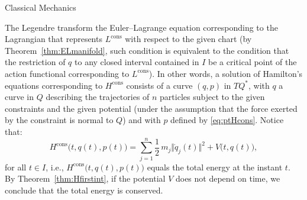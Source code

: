 \documentclass[oneside,a4paper,11pt]{amsbook}
\theoremstyle{remark}\newtheorem{exercise}{Exercise}[chapter]
\theoremstyle{plain}\newtheorem{teo}{Theorem}[section]
\theoremstyle{plain}\newtheorem{lem}[teo]{Lemma}
\theoremstyle{plain}\newtheorem{prop}[teo]{Proposition}
\theoremstyle{plain}\newtheorem{cor}[teo]{Corollary}
\theoremstyle{definition}\newtheorem{defin}[teo]{Definition}
\theoremstyle{remark}\newtheorem{rem}[teo]{Remark}
\theoremstyle{definition}\newtheorem{notation}[teo]{Notation}
\theoremstyle{definition}\newtheorem{convention}[teo]{Convention}
\theoremstyle{definition}\newtheorem{example}[teo]{Example}
\numberwithin{section}{chapter}
\numberwithin{equation}{section}
\begin{document}
\begin{chapter}{Classical Mechanics}
\begin{section}{The Legendre transform}
the Euler--Lagrange equation corresponding to the Lagrangian that represents $L^{\mathrm{cons}}$ with respect to the given chart
(by Theorem~\ref{thm:ELmanifold}, such condition is equivalent to the condition that the restriction of $q$ to any closed interval contained in $I$ be
a critical point of the action functional corresponding to $L^{\mathrm{cons}}$).
In other words, a solution of Hamilton's equations corresponding to $H^{\mathrm{cons}}$ consists of a curve $(q,p)$ in $TQ^*$, with $q$ a curve
in $Q$ describing the trajectories of $n$ particles subject to the given constraints and the given potential (under the assumption that the force exerted by
the constraint is normal to $Q$) and with $p$ defined by \eqref{eq:ptHcons}. Notice that:
\[H^{\mathrm{cons}}\big(t,q(t),p(t)\big)=\sum_{j=1}^n\frac12\,m_j\Vert\dot q_j(t)\Vert^2+V\big(t,q(t)\big),\]
for all $t\in I$, i.e., $H^{\mathrm{cons}}\big(t,q(t),p(t)\big)$ equals the total energy at the instant $t$. By Theorem~\ref{thm:Hfirstint},
if the potential $V$ does not depend on time, we conclude that the total energy is conserved.


\end{section}
\end{chapter}
\end{document}
